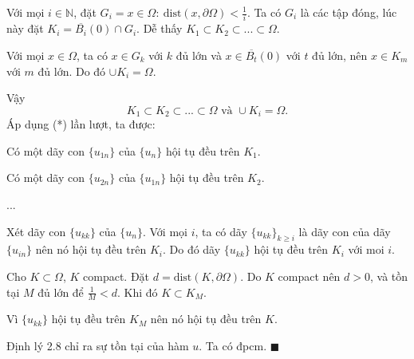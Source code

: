 Với mọi $i\in \mathbb{N}$, đặt $G_i={x\in\Omega :\ \mbox{dist}(x,\partial\Omega)<\frac{1}{i}}$. Ta có $G_i$ là các tập đóng, lúc này đặt $K_i=\overline{B_i}(0)\cap G_i$. Dễ thấy $K_{1} \subset K_{2} \subset ...\subset \Omega$.

Với mọi $x\in\Omega$, ta có $x\in G_k$ với $k$ đủ lớn và $x\in \overline{B_t}(0)$ với $t$ đủ lớn, nên $x\in K_m$ với $m$ đủ lớn. Do đó $\cup K_{i} = \Omega$.

Vậy 
\[K_{1} \subset K_{2} \subset ...\subset \Omega \text{ và }  \cup K_{i} = \Omega .\]
Áp dụng (*) lần lượt, ta được:

Có một dãy con $ \{ u_{1n}\} $ của $ \{ u_{n}\} $ hội tụ đều trên $K_{1}$.

Có một dãy con $ \{ u_{2n}\} $ của $ \{ u_{1n}\} $ hội tụ đều trên $K_{2}$.

...

Xét dãy con $ \{ u_{kk}\}$ của $ \{ u_{n}\} $. Với mọi $i$, ta có dãy $\{u_{kk}\}_{k\geq i}$ là dãy con của dãy $\{u_{in}\}$ nên nó hội tụ đều trên $K_i$. Do đó dãy $\{u_{kk}\}$ hội tụ đều trên $K_i$ với moi $i$.

Cho $K \subset \Omega$, $K$ compact. Đặt $d=\mbox{dist}(K,\partial\Omega)$. Do $K$ compact nên $d>0$, và tồn tại $M$ đủ lớn để $ \frac{1}{M}<d$. Khi đó $K\subset K_M$.

Vì $ \{ u_{kk}\} $ hội tụ đều trên $K_{M}$ nên nó hội tụ đều trên $K$.

Định lý 2.8 chỉ ra sự tồn tại của hàm $u$. Ta có đpcm. $\blacksquare$
